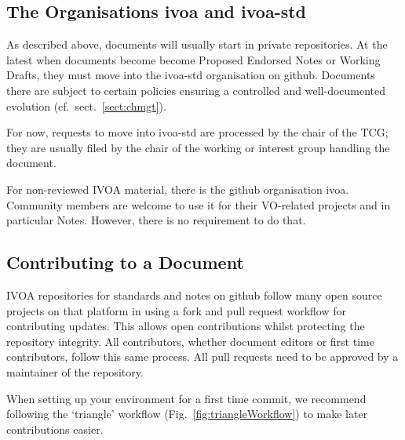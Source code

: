 \documentclass[11pt,a4paper]{ivoa}
\begin{document}
\subsection{The Organisations ivoa and ivoa-std}

As described above, documents will usually start in private
repositories.  At the latest when documents become become Proposed
Endorsed Notes or Working Drafts, they must move into the ivoa-std
organisation on github.
Documents there are subject to certain policies ensuring
a controlled and well-documented evolution (cf.~sect.~\ref{sect:chmgt}).

For now, requests to move into ivoa-std are processed by the chair of
the TCG; they are usually filed by the chair of the working or interest
group handling the document.

For non-reviewed IVOA material, there is the github organisation ivoa.
Community members are welcome to use it for their VO-related projects
and in particular Notes.  However, there is no requirement to do that.


\subsection{Contributing to a Document}
\label{sect:contributing}

IVOA repositories for standards and notes on github follow many
open source projects on that platform in using a fork
and pull request workflow for contributing
updates. This allows open contributions whilst protecting the repository
integrity. All contributors, whether document editors or first time
contributors, follow this same process. All pull requests need to be
approved by a maintainer of the repository.

When setting up your environment for a first time commit, we recommend
following the `triangle' workflow (Fig.~\ref{fig:triangleWorkflow}) to
make later contributions easier.
\end{document}
